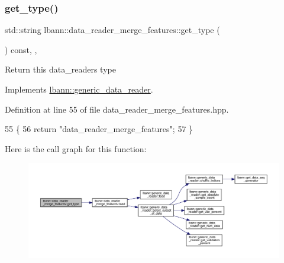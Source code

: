\subsubsection{\texorpdfstring{get\+\_\+type()}{get\_type()}}
{\footnotesize\ttfamily std\+::string lbann\+::data\+\_\+reader\+\_\+merge\+\_\+features\+::get\+\_\+type (\begin{DoxyParamCaption}{ }\end{DoxyParamCaption}) const\hspace{0.3cm}{\ttfamily [inline]}, {\ttfamily [override]}, {\ttfamily [virtual]}}

Return this data\+\_\+reader\textquotesingle{}s type 

Implements \hyperlink{classlbann_1_1generic__data__reader_abeb849fb8e10b4fa317c90bc33f61758}{lbann\+::generic\+\_\+data\+\_\+reader}.



Definition at line 55 of file data\+\_\+reader\+\_\+merge\+\_\+features.\+hpp.


\begin{DoxyCode}
55                                       \{
56     \textcolor{keywordflow}{return} \textcolor{stringliteral}{"data\_reader\_merge\_features"};
57   \}
\end{DoxyCode}
Here is the call graph for this function\+:\nopagebreak
\begin{figure}[H]
\begin{center}
\leavevmode
\includegraphics[width=350pt]{classlbann_1_1data__reader__merge__features_affcf91a640f964ba18de9cb650fb07ad_cgraph}
\end{center}
\end{figure}
\mbox{\label{classlbann_1_1data__reader__merge__features_a8a618de9a92cb148746a83b0381ba781}} 
